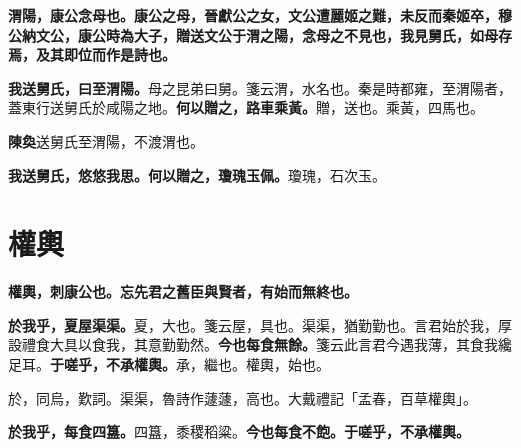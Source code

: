 
\textbf{渭陽，康公念母也。康公之母，晉獻公之女，文公遭麗姬之難，未反而秦姬卒，穆公納文公，康公時為大子，贈送文公于渭之陽，念母之不見也，我見舅氏，如母存焉，及其即位而作是詩也。}

\textbf{我送舅氏，曰至渭陽。}{\footnotesize 母之昆弟曰舅。箋云渭，水名也。秦是時都雍，至渭陽者，蓋東行送舅氏於咸陽之地。}\textbf{何以贈之，路車乘黃。}{\footnotesize 贈，送也。乘黃，四馬也。}

\begin{quoting}\textbf{陳奐}送舅氏至渭陽，不渡渭也。\end{quoting}

\textbf{我送舅氏，悠悠我思。何以贈之，瓊瑰玉佩。}{\footnotesize 瓊瑰，石次玉。}

\section{權輿}


\textbf{權輿，刺康公也。忘先君之舊臣與賢者，有始而無終也。}

\textbf{於我乎，夏屋渠渠。}{\footnotesize 夏，大也。箋云屋，具也。渠渠，猶勤勤也。言君始於我，厚設禮食大具以食我，其意勤勤然。}\textbf{今也每食無餘。}{\footnotesize 箋云此言君今遇我薄，其食我纔足耳。}\textbf{于嗟乎，不承權輿。}{\footnotesize 承，繼也。權輿，始也。}

\begin{quoting}於，同烏，歎詞。渠渠，魯詩作蘧蘧，高也。大戴禮記「孟春，百草權輿」。\end{quoting}

\textbf{於我乎，每食四簋。}{\footnotesize 四簋，黍稷稻粱。}\textbf{今也每食不飽。于嗟乎，不承權輿。}

